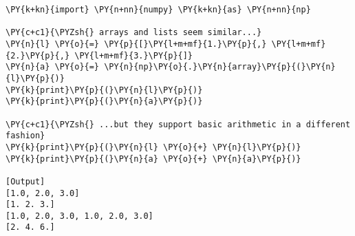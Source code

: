 \begin{Verbatim}[label=\makebox{\url{https://github.com/lucabaldini/cmepda/tree/master/slides/latex/snippets/numpy\_arrays\_vs\_lists.py}},commandchars=\\\{\}]
\PY{k+kn}{import} \PY{n+nn}{numpy} \PY{k+kn}{as} \PY{n+nn}{np}

\PY{c+c1}{\PYZsh{} arrays and lists seem similar...}
\PY{n}{l} \PY{o}{=} \PY{p}{[}\PY{l+m+mf}{1.}\PY{p}{,} \PY{l+m+mf}{2.}\PY{p}{,} \PY{l+m+mf}{3.}\PY{p}{]}
\PY{n}{a} \PY{o}{=} \PY{n}{np}\PY{o}{.}\PY{n}{array}\PY{p}{(}\PY{n}{l}\PY{p}{)}
\PY{k}{print}\PY{p}{(}\PY{n}{l}\PY{p}{)}
\PY{k}{print}\PY{p}{(}\PY{n}{a}\PY{p}{)}

\PY{c+c1}{\PYZsh{} ...but they support basic arithmetic in a different fashion}
\PY{k}{print}\PY{p}{(}\PY{n}{l} \PY{o}{+} \PY{n}{l}\PY{p}{)}
\PY{k}{print}\PY{p}{(}\PY{n}{a} \PY{o}{+} \PY{n}{a}\PY{p}{)}

[Output]
[1.0, 2.0, 3.0]
[1. 2. 3.]
[1.0, 2.0, 3.0, 1.0, 2.0, 3.0]
[2. 4. 6.]
\end{Verbatim}